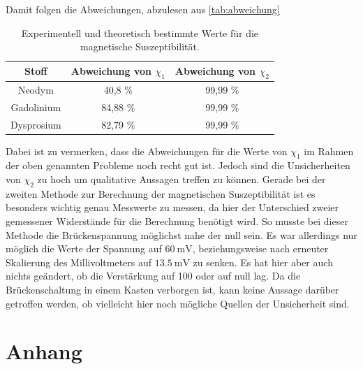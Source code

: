 Damit folgen die Abweichungen, abzulesen aus \autoref{tab:abweichung}
\begin{table}[H]
    \centering
    \caption{Experimentell und theoretisch bestimmte Werte für die magnetische Suszeptibilität.}
    \label{tab:abweichung}
    \begin{tabular}{c| c c}
        \toprule
        Stoff & Abweichung von $\chi_1$ & Abweichung von $\chi_2$ \\
        \midrule
        Neodym &  40,8 \% & 99,99 \% \\
        Gadolinium & 84,88 \% & 99,99 \% \\
        Dysprosium & 82,79 \% & 99,99 \% \\
      \bottomrule
    \end{tabular}
\end{table}


\noindent
Dabei ist zu vermerken, dass die Abweichungen für die Werte von $\chi_1$ im Rahmen der oben genannten Probleme noch recht gut ist. Jedoch sind die Unsicherheiten von $\chi_2$ zu hoch um qualitative Aussagen treffen zu können.
Gerade bei der zweiten Methode zur Berechnung der magnetischen Suszeptibilität ist es besonders wichtig genau Messwerte zu messen, da hier der Unterschied zweier gemessener Widerstände für die Berechnung benötigt wird. So musste bei dieser Methode
die Brückenspannung möglichst nahe der null sein. Es war allerdings nur möglich die Werte der Spannung auf $\SI{60}{\milli\volt}$, beziehungsweise nach erneuter Skalierung des Millivoltmeters auf
$\SI{13,5}{\milli\volt}$ zu senken. Es hat hier aber auch nichts geändert, ob die Verstärkung auf 100 oder auf null lag.
Da die Brückenschaltung in einem Kasten verborgen ist, kann keine Aussage darüber getroffen werden, ob vielleicht hier noch mögliche Quellen der Unsicherheit sind.


\section{Anhang}
\label{sec:Anhang}

